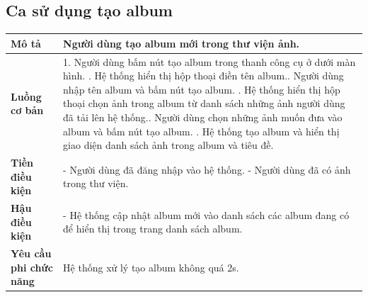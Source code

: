 \subsection{Ca sử dụng tạo album}

\vspace{0.5cm}

\noindent 
\begin{tabularx}{\linewidth}{| l | X |} 
\hline 
\textbf{Mô tả} & Người dùng tạo album mới trong thư viện ảnh. \\
\hline 
\textbf{Luồng cơ bản} & 1. Người dùng bấm nút tạo album trong thanh công cụ ở dưới màn hình. \newline
                       2. Hệ thống hiển thị hộp thoại điền tên album.\newline
                       3. Người dùng nhập tên album và bấm nút tạo album. \newline
                       4. Hệ thống hiển thị hộp thoại chọn ảnh trong album từ danh sách những ảnh người dùng đã tải lên hệ thống.\newline
                       5. Người dùng chọn những ảnh muốn đưa vào album và bấm nút tạo album. \newline
                       6. Hệ thống tạo album và hiển thị giao diện danh sách ảnh trong album và tiêu đề. \\
\hline 
\textbf{Tiền điều kiện} & - Người dùng đã đăng nhập vào hệ thống. \newline
                           - Người dùng đã có ảnh trong thư viện. \\
\hline
\textbf{Hậu điều kiện} & - Hệ thống cập nhật album mới vào danh sách các album đang có để hiển thị trong trang danh sách album. \\
\hline 
\textbf{Yêu cầu phi chức năng} & Hệ thống xử lý tạo album không quá 2s. \\
\hline 
\end{tabularx}

\vspace{0.8cm}

